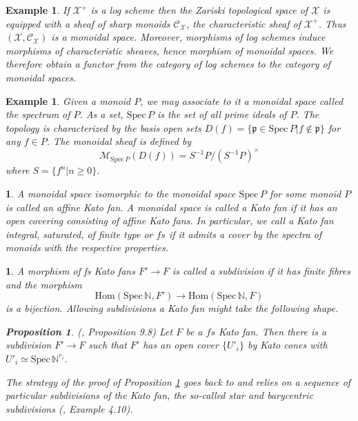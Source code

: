 \documentclass{amsart}%
\numberwithin{equation}{subsection}
\theoremstyle{plain2}
\newtheorem{prop}[equation]{Proposition}
\theoremstyle{definition2}
\newtheorem{example}[equation]{Example}
\theoremstyle{stepstyle}
\theoremstyle{point}
\theoremstyle{subpoint}
\newtheorem{subpoint}[equation]{}%
\newcommand{\spa}[1]{\begin{subpoint}#1\end{subpoint}}           %
\newcommand{\N}{\ensuremath{\mathbb{N}}}
\newcommand{\cX}{\ensuremath{\mathscr{X}}}
\newcommand{\fp}{\ensuremath{\mathfrak{p}}}
\newcommand{\caM}{\ensuremath{\mathcal{M}}}
\newcommand{\caC}{\ensuremath{\mathcal{C}}}
\newcommand{\Spec}{\ensuremath{\mathrm{Spec}\,}}
\newcommand{\Hom}{\mathrm{Hom}}
\begin{document}
\begin{example}
If $\cX^+$ is a log scheme then the Zariski topological space of $\cX$ is equipped with a sheaf of sharp monoids $\caC_{\cX}$, the characteristic sheaf of $\cX^+$. Thus $(\cX,\caC_{\cX})$ is a monoidal space. Moreover, morphisms of log schemes
induce morphisms of characteristic sheaves, hence morphism of monoidal spaces. We therefore obtain a functor from the category of log schemes to the category of monoidal spaces.
\end{example}

\begin{example}
Given a monoid $P$, we may associate to it a monoidal space called the spectrum of $P$. As a set, $\Spec P$ is the set of all prime ideals of $P$. The topology is characterized by the basis open sets $D(f)= \{ \fp \in \Spec P | f \notin \fp \}$ for any $f \in P$. The monoidal sheaf is defined by $$\caM_{\Spec P} (D(f))= S^{-1}P / (S^{-1}P)^{\times}$$ where $S=\{f^n | n \geqslant 0\}$.
\end{example}

\spa{A monoidal space isomorphic to the monoidal space $\Spec P$ for some monoid $P$ is called an affine Kato fan. A monoidal space is called a Kato fan if it has an open covering consisting of affine Kato fans. In particular, we call a Kato fan integral, saturated, of finite type or $fs$ if it admits a cover by the spectra of monoids with the respective properties.}

\spa{A morphism of fs Kato fans $F' \rightarrow F$ is called a \emph{subdivision} if it has finite fibres and the morphism $$\Hom(\Spec \N, F') \rightarrow \Hom (\Spec \N, F)$$ is a bijection. Allowing subdivisions a Kato fan might take the following shape.
\begin{prop} \label{kato subdivision}(\cite{Kato1994a}, Proposition 9.8)
Let $F$ be a $fs$ Kato fan. Then there is a subdivision $F' \rightarrow F$ such that $F'$ has an open cover $\{U'_i\}$ by Kato cones with $U'_i \simeq \Spec \N^{r_i}$. 
\end{prop}
The strategy of the proof of Proposition \ref{kato subdivision} goes back to \cite{KempfKnudsenMumfordEtAl1973} and relies on a sequence of particular subdivisions of the Kato fan, the so-called star and barycentric subdivisions (\cite{AbramovichChenMarcusEtAl2015}, Example 4.10).}
\end{document}
